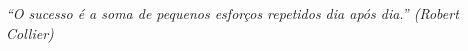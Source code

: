 %
%

\begin{epigrafe}

\textit{``O sucesso é a soma de pequenos esforços repetidos dia após dia.'' (Robert Collier)}


\end{epigrafe}